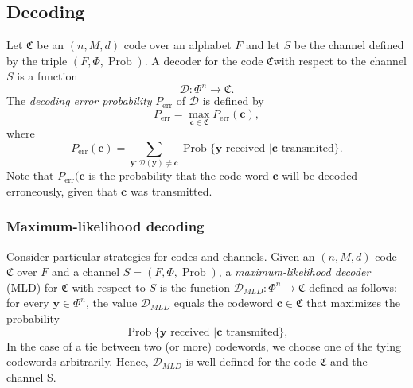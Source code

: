\subsection{Decoding}
Let $\mathfrak{C}$ be an $(n,M,d)$ code over an alphabet $F$ and let $S$ be the channel defined by the triple $(F,\Phi,\operatorname{Prob})$. A decoder for the code $\mathfrak{C}$with respect to the channel $S$ is a function
\begin{equation}
\mathcal{D}: \Phi^n\to \mathfrak{C}.
\end{equation}
The \textit{decoding error probability} $P_{\text{err}}$ of $\mathcal{D}$ is defined by
\begin{equation}
P_{\text{err}} = \max_{\mathbf{c}\in\mathfrak{C}} P_{\text{err}}(\mathbf{c}),
\end{equation}
where 
\begin{equation}
P_{\text{err}}(\mathbf{c}) = \sum_{\mathbf{y}:\mathcal{D}(\mathbf{y})\neq \mathbf{c}} \operatorname{Prob}\{\mathbf{y}\text{ received }|\mathbf{c}\text{ transmited}\}.
\end{equation}
Note that $P_{\text{err}}(\mathbf{c}$ is the probability that the code word $\mathbf{c}$ will be decoded erroneously, given that $\mathbf{c}$ was transmitted.
\subsubsection*{Maximum-likelihood decoding}
Consider particular strategies for codes and channels. Given an $(n,M,d)$ code $\mathfrak{C}$ over $F$ and a channel $S = (F,\Phi,\operatorname{Prob})$, a \textit{maximum-likelihood decoder} (MLD) for $\mathfrak{C}$ with respect to $S$ is the function $\mathcal{D}_{MLD}:\Phi^n\to \mathfrak{C}$ defined as follows: for every $\mathbf{y}\in \Phi^n$, the value  $\mathcal{D}_{MLD}$ equals the codeword $\mathbf{c}\in\mathfrak{C}$ that maximizes the probability
\begin{equation}
\operatorname{Prob}\{\mathbf{y}\text{ received }|\mathbf{c}\text{ transmited}\},
\end{equation}
In the case of a tie between two (or more) codewords, we choose one of the tying codewords arbitrarily. Hence, $\mathcal{D}_{MLD}$ is well-defined for the code $\mathfrak{C}$ and the channel S.
